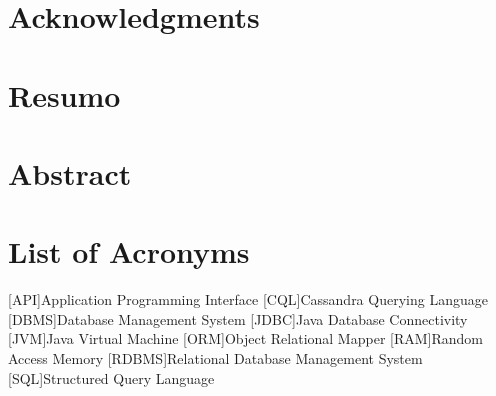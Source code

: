 \documentclass[11pt,a4paper,twoside]{book} %
\begin{document}
	
	\listoftodos
	\newpage
	
	\thispagestyle{empty}
	
	
	\newpage
	
	\newpage
	\thispagestyle{plain}
	\mbox{}
	
	
	
	\newpage
	\thispagestyle{plain}
	\mbox{}
	
	\newpage
	\thispagestyle{empty}
	

	\cleardoublepage
	
	\chapter*{Acknowledgments}
	
	
	\newpage
	\thispagestyle{plain}
	\mbox{}
	
	
	\chapter*{Resumo}
	
	
	\newpage
	\thispagestyle{plain}
	\mbox{}
	
	\chapter*{Abstract}
	
	
	\newpage
	\thispagestyle{plain}
	\mbox{}
		
	
	\tableofcontents{}
	
	
	\listoffigures
    \newpage
    \thispagestyle{plain}
    \mbox{}	
	\listoftables
	\newpage
	\thispagestyle{plain}
	\mbox{}
    
   \chapter*{List of Acronyms}
    \begin{acronym}[TDMA]
	  [API]{Application Programming Interface}
	  [CQL]{Cassandra Querying Language}
	  [DBMS]{Database Management System}
	  [JDBC]{Java Database Connectivity}
	  [JVM]{Java Virtual Machine}
	  [ORM]{Object Relational Mapper}
	  [RAM]{Random Access Memory}
	  [RDBMS]{Relational Database Management System}
	  [SQL]{Structured Query Language}	 
	\end{acronym}
\newpage
\thispagestyle{plain}
\mbox{}
\cleardoublepage
	
\end{document}
